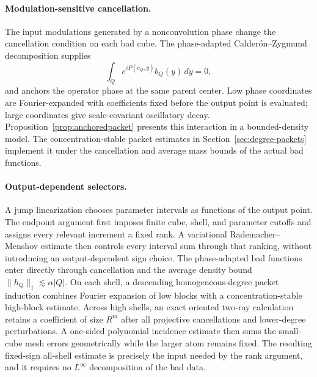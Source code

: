 \documentclass[11pt]{article}
\numberwithin{equation}{section}
\theoremstyle{remark}
\theoremstyle{definition}
\newcommand{\norm}[1]{\lVert #1\rVert}
\begin{document}
\paragraph{Modulation-sensitive cancellation.}
The input modulations generated by a nonconvolution phase change the
cancellation condition on each bad cube. The phase-adapted
Calder\'on--Zygmund decomposition supplies
\[
 \int_Q e^{iP(c_Q,y)}b_Q(y)\,dy=0,
\]
and anchors the operator phase at the same parent center. Low phase
coordinates are Fourier-expanded with coefficients fixed before the
output point is evaluated; large coordinates give scale-covariant
oscillatory decay. Proposition~\ref{prop:anchoredpacket} presents this
interaction in a bounded-density model. The concentration-stable packet
estimates in Section~\ref{sec:degree-packets} implement it under the
cancellation and average mass bounds of the actual bad functions.

\paragraph{Output-dependent selectors.}
A jump linearization chooses parameter intervals as functions of the
output point.  The endpoint argument first imposes finite cube, shell, and
parameter cutoffs and assigns every relevant increment a fixed rank.  A
variational Rademacher--Menshov estimate then controls every interval sum
through that ranking, without introducing an output-dependent sign choice.
The phase-adapted bad functions enter directly through cancellation and
the average density bound
$\norm{h_Q}_1\lesssim\alpha|Q|$.  On each shell, a descending
homogeneous-degree packet induction combines Fourier expansion of low
blocks with a concentration-stable high-block estimate.  Across high
shells, an exact oriented two-ray calculation retains a coefficient of
size $R^m$ after all projective cancellations and lower-degree
perturbations.  A one-sided polynomial incidence estimate then sums the
small-cube mesh errors geometrically while the larger atom remains fixed.
The resulting fixed-sign all-shell estimate is precisely the input needed
by the rank argument, and it requires no $L^\infty$ decomposition of the
bad data.
\end{document}
